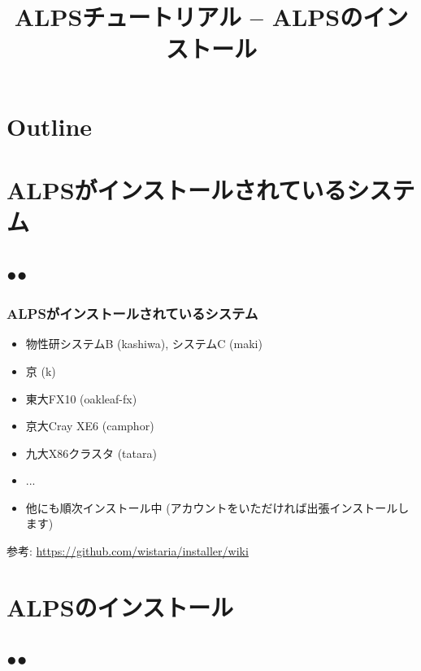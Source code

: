 \title{ALPSチュートリアル -- ALPSのインストール}



\begin{frame}
  \titlepage
\end{frame}

\section*{Outline}
\begin{frame}
  \tableofcontents
\end{frame}

\section{ALPSがインストールされているシステム}
\subsection*{{\protect\color{red}●}{\protect\color{blue}●}}

\begin{frame}[fragile]
  \frametitle{ALPSがインストールされているシステム}
  \begin{itemize}
  \item 物性研システムB (kashiwa), システムC (maki)
  \item 京 (k)
  \item 東大FX10 (oakleaf-fx)
  \item 京大Cray XE6 (camphor)
  \item 九大X86クラスタ (tatara)
  \item ...
  \item 他にも順次インストール中 (アカウントをいただければ出張インストールします)
  \end{itemize}
\begin{semiverbatim}
参考: {\footnotesize \url{https://github.com/wistaria/installer/wiki}}
\end{semiverbatim}
\end{frame}

\section{ALPSのインストール}
\subsection*{{\protect\color{red}●}{\protect\color{blue}●}}

